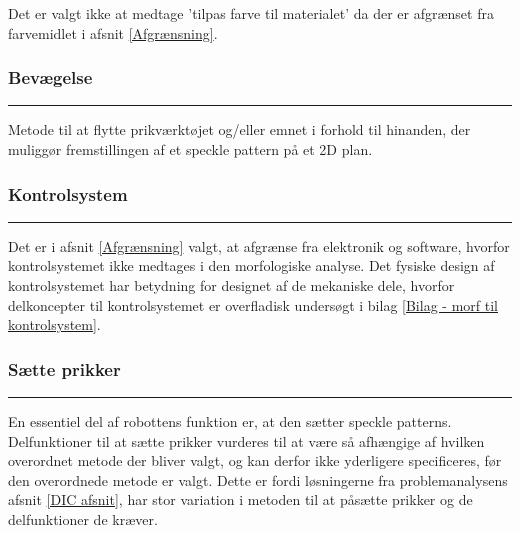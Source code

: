 Det er valgt ikke at medtage 'tilpas farve til materialet' da der er afgrænset fra farvemidlet i afsnit \ref{Afgrænsning}.


\subsubsection{Bevægelse} \plainbreak{-0.5}
Metode til at flytte prikværktøjet og/eller emnet i forhold til hinanden, der muliggør fremstillingen af et speckle pattern på et 2D plan.



\subsubsection{Kontrolsystem}\plainbreak{-0.5}

Det er i afsnit \ref{Afgrænsning} valgt, at afgrænse fra elektronik og software, hvorfor kontrolsystemet ikke medtages i den morfologiske analyse. Det fysiske design af kontrolsystemet har betydning for designet af de mekaniske dele, hvorfor delkoncepter til kontrolsystemet er overfladisk undersøgt i bilag \ref{Bilag - morf til kontrolsystem}.



\subsubsection{Sætte prikker} \plainbreak{-0.5}
En essentiel del af robottens funktion er, at den sætter speckle patterns. Delfunktioner til at sætte prikker vurderes til at være så afhængige af hvilken overordnet metode der bliver valgt, og kan derfor ikke yderligere specificeres, før den overordnede metode er valgt. Dette er fordi løsningerne fra problemanalysens afsnit \ref{DIC afsnit}, har stor variation i metoden til at påsætte prikker og de delfunktioner de kræver. 



